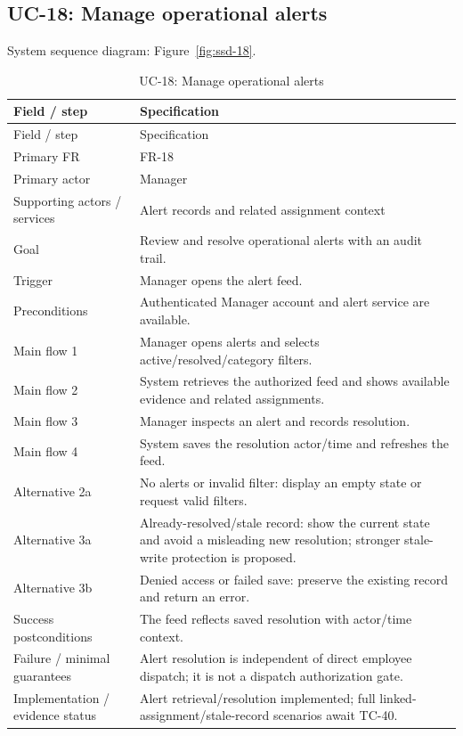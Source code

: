 \subsection*{UC-18: Manage operational alerts}
\label{uc:18}
System sequence diagram: Figure~\ref{fig:ssd-18}.

\begin{longtable}{P{0.23\textwidth}P{0.67\textwidth}}
\caption{UC-18: Manage operational alerts}\\
\toprule
Field / step & Specification\\
\midrule
\endfirsthead
\toprule
Field / step & Specification\\
\midrule
\endhead
Primary FR & FR-18\\
Primary actor & Manager\\
Supporting actors / services & Alert records and related assignment context\\
Goal & Review and resolve operational alerts with an audit trail.\\
Trigger & Manager opens the alert feed.\\
Preconditions & Authenticated Manager account and alert service are available.\\
Main flow 1 & Manager opens alerts and selects active/resolved/category filters.\\
Main flow 2 & System retrieves the authorized feed and shows available evidence and related assignments.\\
Main flow 3 & Manager inspects an alert and records resolution.\\
Main flow 4 & System saves the resolution actor/time and refreshes the feed.\\
Alternative 2a & No alerts or invalid filter: display an empty state or request valid filters.\\
Alternative 3a & Already-resolved/stale record: show the current state and avoid a misleading new resolution; stronger stale-write protection is proposed.\\
Alternative 3b & Denied access or failed save: preserve the existing record and return an error.\\
Success postconditions & The feed reflects saved resolution with actor/time context.\\
Failure / minimal guarantees & Alert resolution is independent of direct employee dispatch; it is not a dispatch authorization gate.\\
Implementation / evidence status & Alert retrieval/resolution implemented; full linked-assignment/stale-record scenarios await TC-40.\\
\bottomrule
\end{longtable}

